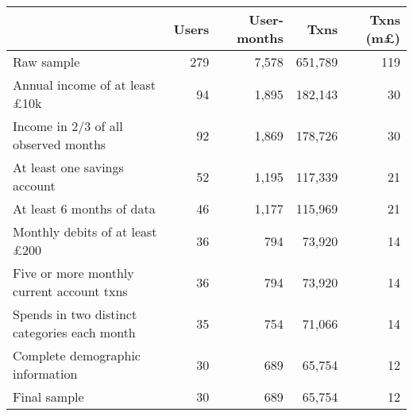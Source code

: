 \begin{tabular}{lrrrr}
\toprule
                                             & Users & User-months &    Txns & Txns (m\pounds) \\
\midrule
                                  Raw sample &   279 &       7,578 & 651,789 &             119 \\
        Annual income of at least \pounds10k &    94 &       1,895 & 182,143 &              30 \\
        Income in 2/3 of all observed months &    92 &       1,869 & 178,726 &              30 \\
                At least one savings account &    52 &       1,195 & 117,339 &              21 \\
                   At least 6 months of data &    46 &       1,177 & 115,969 &              21 \\
       Monthly debits of at least \pounds200 &    36 &         794 &  73,920 &              14 \\
   Five or more monthly current account txns &    36 &         794 &  73,920 &              14 \\
Spends in two distinct categories each month &    35 &         754 &  71,066 &              14 \\
            Complete demographic information &    30 &         689 &  65,754 &              12 \\
                                Final sample &    30 &         689 &  65,754 &              12 \\
\bottomrule
\end{tabular}

